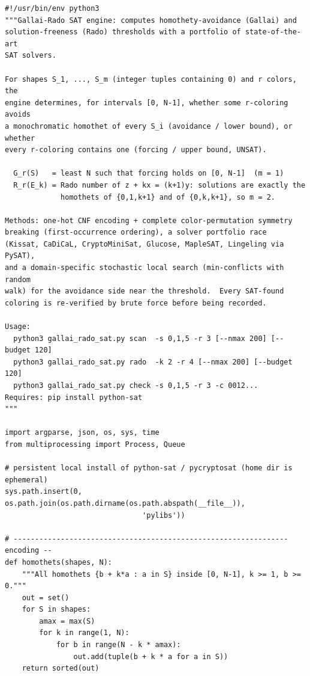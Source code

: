 \documentclass[12pt]{article}
\begin{document}
\begin{lstlisting}[style=plainstyle]
#!/usr/bin/env python3
"""Gallai-Rado SAT engine: computes homothety-avoidance (Gallai) and
solution-freeness (Rado) thresholds with a portfolio of state-of-the-art
SAT solvers.

For shapes S_1, ..., S_m (integer tuples containing 0) and r colors, the
engine determines, for intervals [0, N-1], whether some r-coloring avoids
a monochromatic homothet of every S_i (avoidance / lower bound), or whether
every r-coloring contains one (forcing / upper bound, UNSAT).

  G_r(S)   = least N such that forcing holds on [0, N-1]  (m = 1)
  R_r(E_k) = Rado number of z + kx = (k+1)y: solutions are exactly the
             homothets of {0,1,k+1} and of {0,k,k+1}, so m = 2.

Methods: one-hot CNF encoding + complete color-permutation symmetry
breaking (first-occurrence ordering), a solver portfolio race
(Kissat, CaDiCaL, CryptoMiniSat, Glucose, MapleSAT, Lingeling via PySAT),
and a domain-specific stochastic local search (min-conflicts with random
walk) for the avoidance side near the threshold.  Every SAT-found
coloring is re-verified by brute force before being recorded.

Usage:
  python3 gallai_rado_sat.py scan  -s 0,1,5 -r 3 [--nmax 200] [--budget 120]
  python3 gallai_rado_sat.py rado  -k 2 -r 4 [--nmax 200] [--budget 120]
  python3 gallai_rado_sat.py check -s 0,1,5 -r 3 -c 0012...
Requires: pip install python-sat
"""

import argparse, json, os, sys, time
from multiprocessing import Process, Queue

# persistent local install of python-sat / pycryptosat (home dir is ephemeral)
sys.path.insert(0, os.path.join(os.path.dirname(os.path.abspath(__file__)),
                                'pylibs'))

# ---------------------------------------------------------------- encoding --
def homothets(shapes, N):
    """All homothets {b + k*a : a in S} inside [0, N-1], k >= 1, b >= 0."""
    out = set()
    for S in shapes:
        amax = max(S)
        for k in range(1, N):
            for b in range(N - k * amax):
                out.add(tuple(b + k * a for a in S))
    return sorted(out)


\end{lstlisting}
\end{document}
